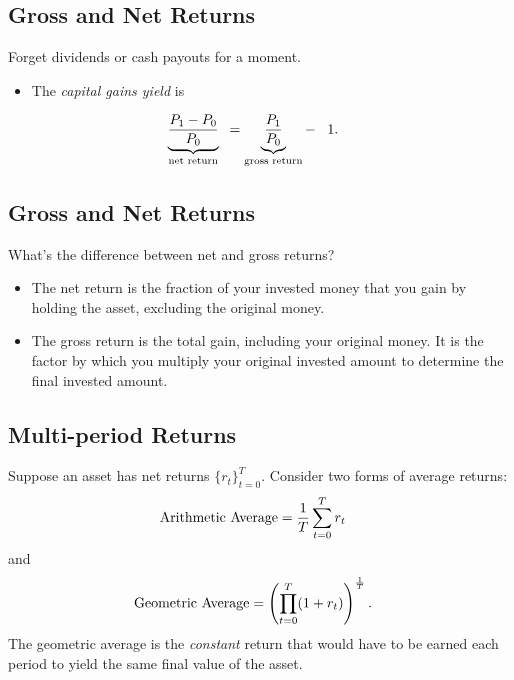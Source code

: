\documentclass[letterpaper,10pt,english]{sphinxmanual}
\begin{document}
\subsection{Gross and Net Returns}
\label{returns:gross-and-net-returns}
Forget dividends or cash payouts for a moment.
\begin{itemize}
\item {} 
The \emph{capital gains yield} is

\end{itemize}
\begin{gather}
\begin{split}\underbrace{\frac{P_1 - P_0}{P_0}}_\text{net return}\,\,\, & =
\underbrace{\frac{P_1}{P_0}}_\text{gross return} - \,\,\,\,\, 1.\end{split}\notag
\end{gather}

\subsection{Gross and Net Returns}
\label{returns:id1}
What's the difference between net and gross returns?
\begin{itemize}
\item {} 
The net return is the fraction of your invested money that you gain
by holding the asset, excluding the original money.

\end{itemize}
\begin{itemize}
\item {} 
The gross return is the total gain, including your original
money. It is the factor by which you multiply your original invested
amount to determine the final invested amount.

\end{itemize}


\subsection{Multi-period Returns}
\label{returns:multi-period-returns}
Suppose an asset has net returns $\{r_t\}_{t=0}^{T}$. Consider two
forms of average returns:
\begin{gather}
\begin{split}\text{Arithmetic Average} & = \frac{1}{T} \sum_{t=0}^T r_t\end{split}\notag
\end{gather}
and
\begin{gather}
\begin{split}\text{Geometric Average} & = \left(\prod_{t=0}^T
(1+r_t)\right)^{\frac{1}{T}}.\end{split}\notag
\end{gather}
The geometric average is the \emph{constant} return that would
have to be earned each period to yield the same final value of the
asset.
\end{document}
